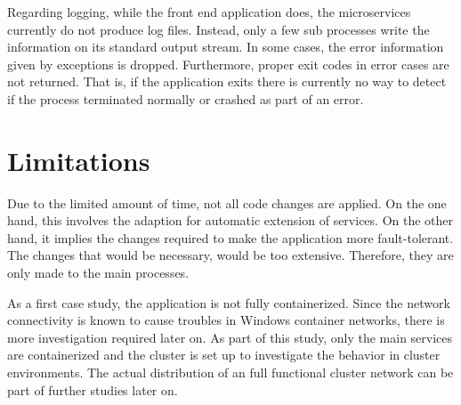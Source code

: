 Regarding logging, while the front end application does, the microservices currently do not produce log files. Instead, only a few sub processes write the information on its standard output stream. In some cases, the error information given by exceptions is dropped.
Furthermore, proper exit codes in error cases are not returned. That is, if the application exits there is currently no way to detect if the process terminated normally or crashed as part of an error.

\section{Limitations}
Due to the limited amount of time, not all code changes are applied. On the one hand, this involves the adaption for automatic extension of services. On the other hand, it implies the changes required to make the application more fault-tolerant. The changes that would be necessary, would be too extensive. Therefore, they are only made to the main processes.

As a first case study, the application is not fully containerized. Since the network connectivity is known to cause troubles in \ac{Windows} container networks, there is more investigation required later on. As part of this study, only the main services are containerized and the cluster is set up to investigate the behavior in cluster environments. The actual distribution of an full functional cluster network can be part of further studies later on.
